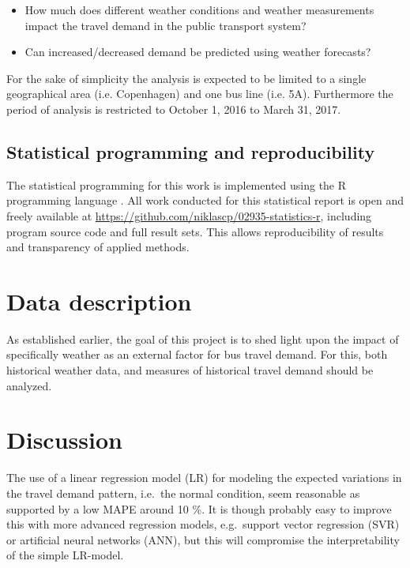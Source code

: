 \documentclass[a4paper,11pt]{article}
\begin{document}
\begin{itemize}
    \item How much does different weather conditions and weather measurements impact the travel demand in the public transport system?
    \item Can increased/decreased demand be predicted using weather forecasts?
\end{itemize}

For the sake of simplicity the analysis is expected to be limited to a single geographical area (i.e. Copenhagen) and one bus line (i.e. 5A). Furthermore the period of analysis is restricted to October 1, 2016 to March 31, 2017. 

\subsection{Statistical programming and reproducibility}\label{ch:reproducibility}
The statistical programming for this work is implemented using the R programming language \citep{R}. All work conducted for this statistical report is open and freely available at \url{https://github.com/niklascp/02935-statistics-r}, including program source code and full result sets. This allows reproducibility of results and transparency of applied methods.
\clearpage

\section{Data description}\label{ch:desc}
As established earlier, the goal of this project is to shed light upon the impact of specifically weather as an external factor for bus travel demand. For this, both historical weather data, and measures of historical travel demand should be analyzed.




\clearpage


\clearpage


\clearpage

\section{Discussion}
The use of a linear regression model (LR) for modeling the expected variations in the travel demand pattern, i.e.\ the normal condition, seem reasonable as supported by a low MAPE around 10 \%. It is though probably easy to improve this with more advanced regression models, e.g.\ support vector regression (SVR) or artificial neural networks (ANN), but this will compromise the interpretability of the simple LR-model.
\end{document}
